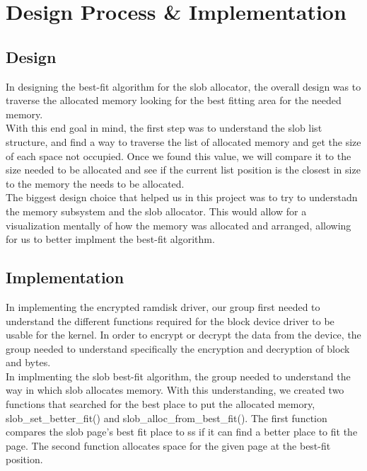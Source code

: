 \documentclass[letterpaper,10pt,titlepage]{article}
\begin{document}
%
%

\section{Design Process \& Implementation}
\subsection*{Design}

In designing the best-fit algorithm for the slob allocator, the overall design was to traverse the allocated memory looking for the best fitting area for the needed memory.\\

With this end goal in mind, the first step was to understand the slob list structure, and find a way to traverse the list of allocated memory and get the size of each space not occupied. Once we found this value, we will compare it to the size needed to be allocated and see if the current list position is the closest in size to the memory the needs to be allocated.\\

The biggest design choice that helped us in this project was to try to understadn the memory subsystem and the slob allocator. This would allow for a visualization mentally of how the memory was allocated and arranged, allowing for us to better implment the best-fit algorithm.

\subsection*{Implementation}

In implementing the encrypted ramdisk driver, our group first needed to understand the different functions required for the block device driver to be usable for the kernel. In order to encrypt or decrypt the data from the device, the group needed to understand specifically the encryption and decryption of block and bytes.\\

In implmenting the slob best-fit algorithm, the group needed to understand the way in which slob allocates memory. With this understanding, we created two functions that searched for the best place to put the allocated memory, slob\_set\_better\_fit() and slob\_alloc\_from\_best\_fit(). The first function compares the slob page's best fit place to ss if it can find a better place to fit the page. The second function allocates space for the given page at the best-fit position.
\end{document}
